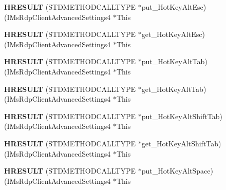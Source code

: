 \begin{DoxyCompactItemize}
{\bfseries H\+R\+E\+S\+U\+LT} (S\+T\+D\+M\+E\+T\+H\+O\+D\+C\+A\+L\+L\+T\+Y\+PE $\ast$put\+\_\+\+Hot\+Key\+Alt\+Esc)(I\+Ms\+Rdp\+Client\+Advanced\+Settings4 $\ast$This
\item 
\mbox{\label{struct_i_ms_rdp_client_advanced_settings4_vtbl_af3012e8ca8eee05dbe3f60b987943bc2}} 
{\bfseries H\+R\+E\+S\+U\+LT} (S\+T\+D\+M\+E\+T\+H\+O\+D\+C\+A\+L\+L\+T\+Y\+PE $\ast$get\+\_\+\+Hot\+Key\+Alt\+Esc)(I\+Ms\+Rdp\+Client\+Advanced\+Settings4 $\ast$This
\item 
\mbox{\label{struct_i_ms_rdp_client_advanced_settings4_vtbl_a04aa959bedb8266dab9941ffc274e1fa}} 
{\bfseries H\+R\+E\+S\+U\+LT} (S\+T\+D\+M\+E\+T\+H\+O\+D\+C\+A\+L\+L\+T\+Y\+PE $\ast$put\+\_\+\+Hot\+Key\+Alt\+Tab)(I\+Ms\+Rdp\+Client\+Advanced\+Settings4 $\ast$This
\item 
\mbox{\label{struct_i_ms_rdp_client_advanced_settings4_vtbl_a90b7a7b7719c76cacbe1d15a32dc956f}} 
{\bfseries H\+R\+E\+S\+U\+LT} (S\+T\+D\+M\+E\+T\+H\+O\+D\+C\+A\+L\+L\+T\+Y\+PE $\ast$get\+\_\+\+Hot\+Key\+Alt\+Tab)(I\+Ms\+Rdp\+Client\+Advanced\+Settings4 $\ast$This
\item 
\mbox{\label{struct_i_ms_rdp_client_advanced_settings4_vtbl_af1e569d93c183fad04872a33a8872bca}} 
{\bfseries H\+R\+E\+S\+U\+LT} (S\+T\+D\+M\+E\+T\+H\+O\+D\+C\+A\+L\+L\+T\+Y\+PE $\ast$put\+\_\+\+Hot\+Key\+Alt\+Shift\+Tab)(I\+Ms\+Rdp\+Client\+Advanced\+Settings4 $\ast$This
\item 
\mbox{\label{struct_i_ms_rdp_client_advanced_settings4_vtbl_ad4c3cb8017811f9139c5b3ee61abc3e3}} 
{\bfseries H\+R\+E\+S\+U\+LT} (S\+T\+D\+M\+E\+T\+H\+O\+D\+C\+A\+L\+L\+T\+Y\+PE $\ast$get\+\_\+\+Hot\+Key\+Alt\+Shift\+Tab)(I\+Ms\+Rdp\+Client\+Advanced\+Settings4 $\ast$This
\item 
\mbox{\label{struct_i_ms_rdp_client_advanced_settings4_vtbl_adc81fa401e2fb2af0ad2d40928d742ba}} 
{\bfseries H\+R\+E\+S\+U\+LT} (S\+T\+D\+M\+E\+T\+H\+O\+D\+C\+A\+L\+L\+T\+Y\+PE $\ast$put\+\_\+\+Hot\+Key\+Alt\+Space)(I\+Ms\+Rdp\+Client\+Advanced\+Settings4 $\ast$This

\end{DoxyCompactItemize}
